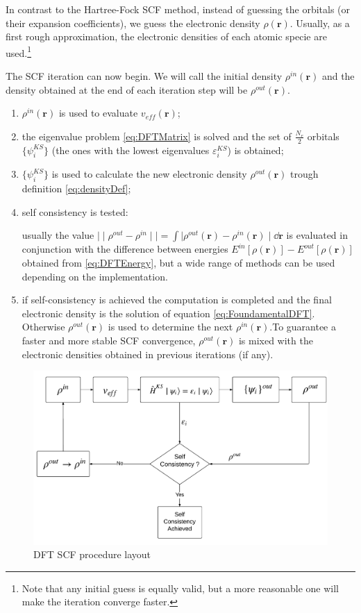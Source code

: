 \documentclass[a4paper,12pt]{article}
\newcommand\dens{\rho(\mathbf{r})}
\newcommand\erre{\mathbf{r}}
\begin{document}
In contrast to the Hartree-Fock SCF method, instead of guessing the orbitals (or their expansion coefficients), we guess the electronic density $\dens$. 
Usually, as a first rough approximation, the electronic densities of each atomic specie are used.\footnote{Note that any initial guess is equally valid, but a more reasonable one will make the iteration converge faster.}

The SCF iteration can now begin. 
We will call the initial density $\rho^{in}(\erre)$ and  the density obtained at the end of each iteration step will be $\rho^{out}(\erre)$.


\begin{enumerate}
	\item $\rho^{in}(\erre)$ is used to evaluate $v_{eff}(\erre)$;
	\item the eigenvalue problem \eqref{eq:DFTMatrix} is solved and the set of $\frac{N_{e}}{2}$ orbitals $\{ \psi^{KS}_i \}$  (the ones with the lowest eigenvalues $\varepsilon^{KS}_i$) is obtained; \label{en:SCFDiag}
	\item $\{ \psi^{KS}_i \}$ is used to calculate the new electronic density $\rho^{out}(\erre)$ trough definition \eqref{eq:densityDef};
	\item self consistency is tested: 
	
	usually the value $\mid\mid \rho^{out} - \rho^{in} \mid\mid = \int \mid \rho^{out}(\erre) - \rho^{in}(\erre)\mid \dd{\erre} $ is evaluated in conjunction with the difference between energies $E^{in}[\dens] - E^{out}[\dens]$ obtained from \eqref{eq:DFTEnergy}, but a wide range of methods can be used depending on the implementation. 
	\item if self-consistency is achieved the computation is completed and the final electronic density is the solution of equation \eqref{eq:FoundamentalDFT}. Otherwise $\rho^{out}(\erre)$ is used to determine the next $\rho^{in}(\erre)$.To guarantee a faster and more stable SCF convergence, $\rho^{out}(\erre)$ is mixed with the electronic densities obtained in previous iterations (if any).
\end{enumerate}


\begin{figure}[h]
	\includegraphics[width=\linewidth]{SCF-DFT_schema.pdf}
	\caption{DFT SCF procedure layout}
\end{figure}
\end{document}
